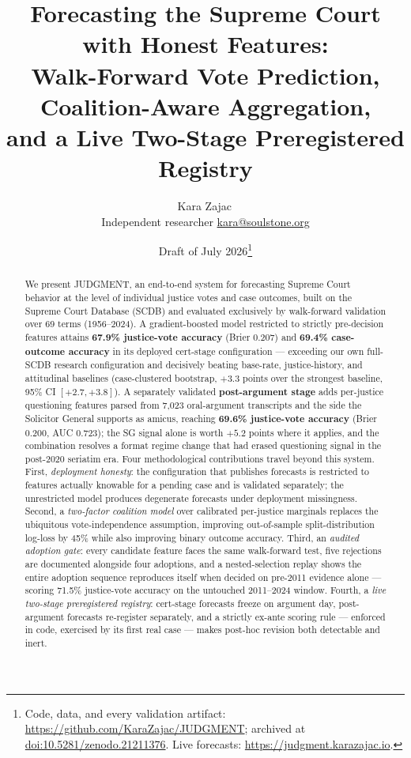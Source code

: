 \documentclass[11pt]{article}
\title{Forecasting the Supreme Court with Honest Features:\\
Walk-Forward Vote Prediction, Coalition-Aware Aggregation,\\
and a Live Two-Stage Preregistered Registry}
\author{Kara Zajac\,\orcidlink{0009-0001-7400-1394}\\
\small Independent researcher \quad \href{mailto:kara@soulstone.org}{kara@soulstone.org}}
\date{Draft of July 2026\thanks{Code, data, and every validation artifact:
\url{https://github.com/KaraZajac/JUDGMENT}; archived at
\href{https://doi.org/10.5281/zenodo.21211376}{doi:10.5281/zenodo.21211376}.
Live forecasts: \url{https://judgment.karazajac.io}.}}
\begin{document}
\maketitle

\begin{abstract}
\noindent We present JUDGMENT, an end-to-end system for forecasting Supreme Court
behavior at the level of individual justice votes and case outcomes, built on the
Supreme Court Database (SCDB) and evaluated exclusively by walk-forward validation
over 69 terms (1956--2024). A gradient-boosted model restricted to strictly
pre-decision features attains \textbf{67.9\% justice-vote accuracy} (Brier 0.207)
and \textbf{69.4\% case-outcome accuracy} in its deployed cert-stage configuration
--- exceeding our own full-SCDB research configuration and decisively beating
base-rate, justice-history, and attitudinal baselines (case-clustered bootstrap,
$+3.3$ points over the strongest baseline, 95\% CI $[+2.7, +3.8]$). A separately
validated \textbf{post-argument stage} adds per-justice questioning features parsed
from 7{,}023 oral-argument transcripts and the side the Solicitor General supports
as amicus, reaching \textbf{69.6\% justice-vote accuracy} (Brier 0.200,
AUC 0.723); the SG signal alone is worth $+5.2$ points where it applies, and the
combination resolves a format regime change that had erased questioning signal
in the post-2020 seriatim era. Four methodological contributions travel beyond
this system. First, \emph{deployment honesty}: the configuration that publishes
forecasts is restricted to features actually knowable for a pending case and is
validated separately; the unrestricted model produces degenerate forecasts under
deployment missingness. Second, a \emph{two-factor coalition model} over calibrated
per-justice marginals replaces the ubiquitous vote-independence assumption,
improving out-of-sample split-distribution log-loss by 45\% while also improving
binary outcome accuracy. Third, an \emph{audited adoption gate}: every candidate
feature faces the same walk-forward test, five rejections are documented alongside
four adoptions, and a nested-selection replay shows the entire adoption sequence
reproduces itself when decided on pre-2011 evidence alone --- scoring 71.5\%
justice-vote accuracy on the untouched 2011--2024 window. Fourth, a \emph{live
two-stage preregistered registry}: cert-stage forecasts freeze on argument day,
post-argument forecasts re-register separately, and a strictly ex-ante scoring
rule --- enforced in code, exercised by its first real case --- makes post-hoc
revision both detectable and inert.
\end{abstract}
\end{document}
